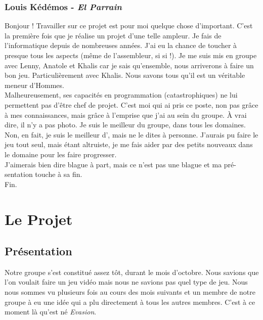 \documentclass{report}
\begin{document}
\subsubsection*{Louis Kédémos -  \textcolor{pseudoblue}{\textit{El Parrain}}}

Bonjour ! Travailler sur ce projet est pour moi quelque chose d'important. C'est la première fois que je réalise un projet d'une telle ampleur. Je fais de l'informatique depuis de nombreuses années. J'ai eu la chance de toucher à presque tous les aspects (même de l'assembleur, si si !). Je me suis mis en groupe avec Lenny, Anatole et Khalis car je sais qu'ensemble, nous arriverons à faire un bon jeu. Particulièrement avec Khalis. Nous savons tous qu'il est un véritable meneur d'Hommes.\\

Malheureusement, ses capacités en programmation (catastrophiques) ne lui permettent pas d'être chef de projet. C'est moi qui ai pris ce poste, non pas grâce à mes connaissances, mais grâce à l'emprise que j'ai au sein du groupe. À vrai dire, il n'y a pas photo. Je suis le meilleur du groupe, dans tous les domaines. Non, en fait, je suis le meilleur d', mais ne le dites à personne. J'aurais pu faire le jeu tout seul, mais étant altruiste, je me fais aider par des petits nouveaux dans le domaine pour les faire progresser.\\

J'aimerais bien dire blague à part, mais ce n'est pas une blague et ma pré- sentation touche à sa fin.\\

Fin.


\newpage


\section[Le Projet]{Le Projet}

\subsection[Présentation]{Présentation}
Notre groupe s'est constitué assez tôt,  durant le mois d'octobre. Nous savions que l'on voulait faire un jeu vidéo mais nous ne savions pas quel type de jeu. Nous nous sommes vu plusieurs fois au cours des mois suivants et un membre de notre groupe à eu une idée qui a plu directement à tous les autres membres. C'est à ce moment là qu'est né \textit{Evasion}.\\\\
\end{document}
